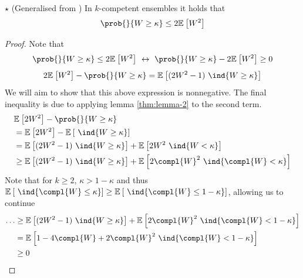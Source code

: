 \documentclass[../main.tex]{subfiles}
\begin{document}
\begin{lemma} $\star$ (Generalised from \cite{theisen}) In $k$-competent ensembles it holds that
\label{thm:lemma-claim}
$$
\prob{}{W \geq \kappa} \leq 2 \mathbb{E}_{}\left[ W^2 \right] 
$$
\end{lemma}
\begin{proof}
Note that
$$
\prob{}{W \geq \kappa} \leq 2 \mathbb{E}_{}\left[ W^2 \right] ~\leftrightarrow~ 
\prob{}{W \geq \kappa} - 2 \mathbb{E}_{}\left[ W^2 \right] \geq 0
$$
$$
2\mathbb{E}_{}\left[ W^2 \right] - \prob{}{W \geq \kappa} = 
\mathbb{E}_{}\left[ (2W^2-1)~\ind{W \geq \kappa} \right]
$$
We will aim to show that this above expression is nonnegative.
The  final inequality is due to applying lemma \ref{thm:lemma-2} to the second term.
\begin{align*}
& \mathbb{E}_{}\left[ 2W^2 \right]  - \prob{}{W \geq \kappa}  \\
&= \mathbb{E}_{}\left[ 2W^2 \right]  - \mathbb{E}_{}\left[ ~\ind{W \geq \kappa} \right]  \\
&= \mathbb{E}_{}\left[ (2W^2 - 1) ~\ind{W \geq \kappa} \right]  + \mathbb{E}_{}\left[ 2W^2 ~\ind{W < \kappa} \right] \\
& \geq  \mathbb{E}_{}\left[ (2W^2 - 1) ~\ind{W \geq \kappa} \right]  + \mathbb{E}_{}\left[ 2\compl{W} ^2 ~\ind{\compl{W}  < \kappa} \right] 
\end{align*}
Note that for $k \geq 2$, $\kappa > 1-\kappa$ and thus $\mathbb{E}_{}\left[ ~\ind{\compl{W} \leq \kappa} \right] \geq \mathbb{E}_{}\left[ ~\ind{\compl{W} \leq 1 - \kappa} \right]$, allowing us to continue
\begin{align*}
\dots &\geq 
\mathbb{E}_{}\left[ (2W^2 - 1) ~\ind{W \geq \kappa} \right]  + \mathbb{E}_{}\left[ 2\compl{W} ^2 ~\ind{\compl{W}  < 1-\kappa} \right]  \\
&= \mathbb{E}_{}\left[ 1-4 \compl{W} + 2 \compl{W}^2 ~\ind{\compl{W} < 1-\kappa }  \right]  \\
& \geq 0
\end{align*}
\end{proof}


\end{document}
